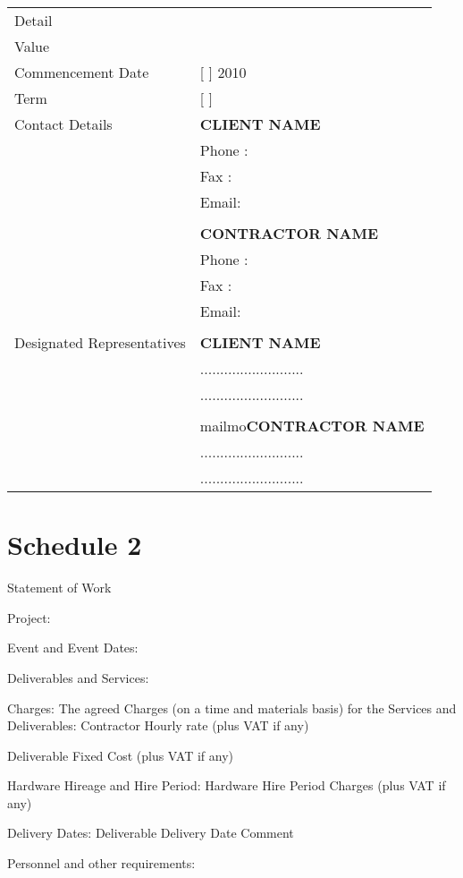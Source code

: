 \documentclass[a4paper,12pt]{article}
\newcommand{\contractorName}{CONTRACTOR NAME }
\newcommand{\clientName}{CLIENT NAME }
\begin{document}
\begin{tabular}{ll}
Detail&\\
Value&\\
Commencement Date&[                 ] 2010\\
Term	&[     ]\\
Contact Details&\textbf{\clientName}\\
&Phone :	\\
&Fax : 	\\
&Email:	\\
\\
&\textbf{\contractorName}\\
&Phone :	\\
&Fax : 	\\
&Email:	\\
\\
Designated Representatives&\textbf{\clientName}\\
&..........................\\
&..........................\\
\\
&mailmo\textbf{\contractorName}\\
&..........................\\
&..........................\\
\end{tabular}

\newpage
\part*{Schedule 2}
\begin{Large}
Statement of Work
\end{Large}

Project:

Event and Event Dates:

Deliverables and Services: 

Charges:
The agreed Charges (on a time and materials basis) for the Services and Deliverables:
Contractor	Hourly rate (plus VAT if any)
	
	

Deliverable	Fixed Cost (plus VAT if any)
	
	

Hardware Hireage and Hire Period:
Hardware	Hire Period	Charges (plus VAT if any)
		

Delivery Dates:
Deliverable	Delivery Date	Comment
		

Personnel and other requirements:
\end{document}
